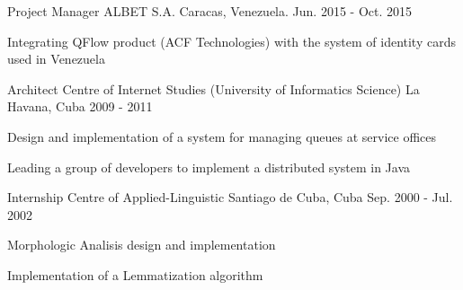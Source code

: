 


\begin{cventries}


\cventry
{Project Manager} %
{ALBET S.A.} %
{Caracas, Venezuela.} %
{Jun. 2015 - Oct. 2015} %
{ %
\begin{cvitems}
\item {Integrating QFlow product (ACF Technologies) with the system of identity cards used in Venezuela}
\end{cvitems}
}


\cventry
{Architect} %
{Centre of Internet Studies (University of Informatics Science)} %
{La Havana, Cuba} %
{2009 - 2011} %
{ %
\begin{cvitems}
\item {Design and implementation of a system for managing queues at service offices}
\item {Leading a group of developers to implement a distributed system in Java}
\end{cvitems} 
}


\cventry
{Internship} %
{Centre of Applied-Linguistic} %
{Santiago de Cuba, Cuba} %
{Sep. 2000 - Jul. 2002} %
{ %
\begin{cvitems}
\item {Morphologic Analisis design and implementation}
\item {Implementation of a Lemmatization algorithm}
\end{cvitems}
}


\end{cventries}

